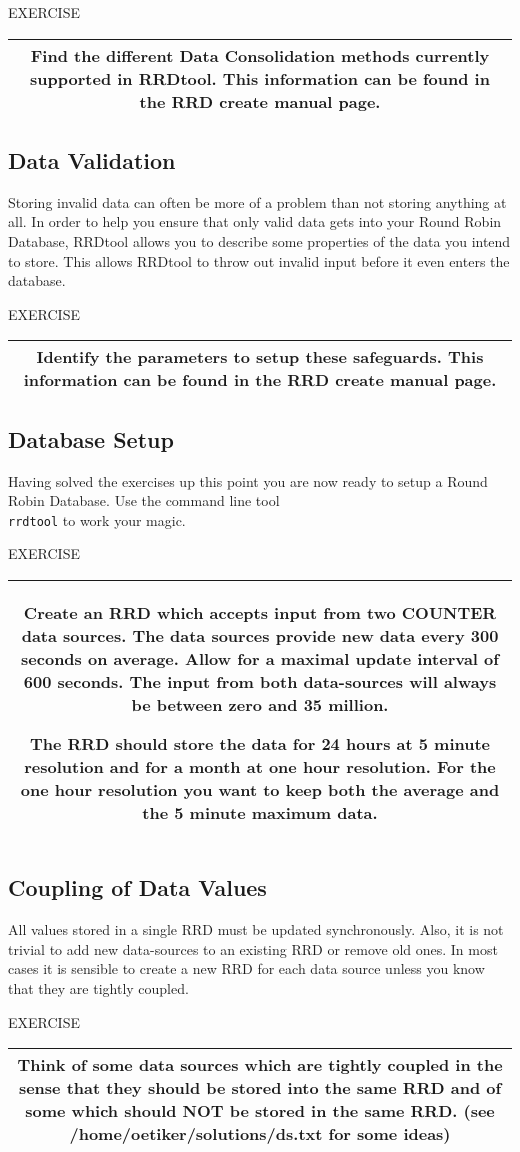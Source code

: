 \documentclass[a4paper,12pt]{article}
\newenvironment{work}{\textsf{\tiny EXERCISE}\nopagebreak\\[0.3ex]\begin{tabular}{|c|}
 \hline
 \begin{minipage}{0.965\linewidth}%
 \setlength{\parskip}{1.6ex plus 0.6ex minus 0.4ex}%
 \rule{0pt}{2.8ex}\ignorespaces}
{\rule[-1.8ex]{0pt}{0pt}\end{minipage}\\
 \hline
 \end{tabular}}
\newcommand{\ex}[1]{\subsection{#1}}
\newcommand{\cmd}[1]{\texttt{\mbox{#1}}}
\begin{document}
\begin{work}
  Find the different Data Consolidation methods currently supported in
  RRDtool. This information can be found in the RRD create manual
  page.
\end{work}

\ex{Data Validation}

Storing invalid data can often be more of a problem than not storing
anything at all. In order to help you ensure that only valid data gets
into your Round Robin Database, RRDtool allows you to
describe some properties of the data you intend to store. This allows
RRDtool to throw out invalid input before it even enters the database.

\begin{work}
Identify the parameters to setup these safeguards. This information
can be found in the RRD create manual page.\end{work}

\ex{Database Setup}

Having solved the exercises up this point you are now ready to setup a
Round Robin Database. Use the command line tool\\
\cmd{rrdtool} to work your magic. 

\begin{work}
  Create an RRD which accepts input from two COUNTER
  data sources. The data sources provide new data every 300 seconds on
  average. Allow for a maximal update interval of 600 seconds. The
  input from both data-sources will always be between zero and 35
  million.
  
  The RRD should store the data for 24 hours at 5 minute resolution
  and for a month at one hour resolution. For the one hour resolution
  you want to keep both the average and the 5 minute maximum data.
\end{work}

\ex{Coupling of Data Values}

All values stored in a single RRD must be updated synchronously. Also,
it is not trivial to add new data-sources to an existing RRD or remove
old ones. In most cases it is sensible to create a new RRD for each
data source unless you know that they are tightly coupled.

\begin{work}
  Think of some data sources which are tightly coupled in the sense that
  they should be stored into the same RRD and of some which should NOT be
  stored in the same RRD. (see /home/oetiker/solutions/ds.txt for some ideas)
\end{work}
\end{document}
